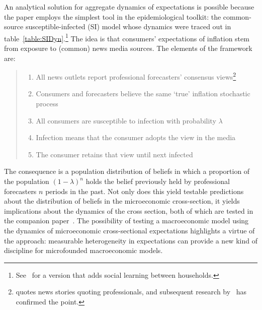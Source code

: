 An analytical solution for aggregate dynamics of expectations is possible because the paper employs the simplest tool in the epidemiological toolkit: the common-source susceptible-infected (SI) model whose dynamics were traced out in table~\ref{table:SIDyn}.\footnote{See~\cite{easaw2015households} for a version that adds social learning between households.}   The idea is that consumers' expectations of inflation stem from exposure to (common) news media sources.  The elements of the framework are:
\begin{quote}
    \normalfont
\begin{enumerate}
    \item All news outlets report professional forecasters' consensus views\footnote{\cite{carroll2003macroeconomic} quotes news stories quoting professionals, and subsequent research by~\cite{lamla2014role} has confirmed the point.}
    \item Consumers and forecasters believe the same `true' inflation stochastic process
    \item All consumers are susceptible to infection with probability $\lambda$
    \item Infection means that the consumer adopts the view in the media
    \item The consumer retains that view until next infected
\end{enumerate}
\end{quote}

The consequence is a population distribution of beliefs in which a proportion of the population $(1-\lambda)^{n}$ holds the belief previously held by professional forecasters $n$ periods in the past.  Not only does this yield testable predictions about the distribution of beliefs in the microeconomic cross-section, it yields implications about the dynamics of the cross section, both of which are tested in the companion paper~\cite{carroll2001epidemiology}.  The possibility of testing a macroeconomic model using the dynamics of microeconomic cross-sectional expectations highlights a virtue of the approach:  measurable heterogeneity in expectations can provide a new kind of discipline for microfounded macroeconomic models.

